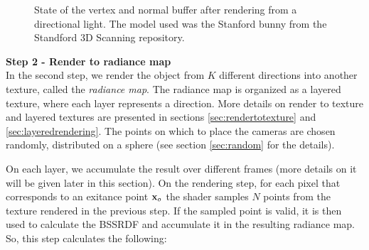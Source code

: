 \begin{figure}
\centering
{}
\label{fig:lightbuffers}
\caption{State of the vertex and normal buffer after rendering from a directional light. The model used was the Stanford bunny from the Standford 3D Scanning repository.}
\end{figure}

\textbf{Step 2 - Render to radiance map} \\
In the second step, we render the object from $K$ different directions into another texture, called the \emph{radiance map}. The radiance map is organized as a layered texture, where each layer represents a direction. More details on render to texture and layered textures are presented in sections \ref{sec:rendertotexture} and \ref{sec:layeredrendering}. The points on which to place the cameras are chosen randomly, distributed on a sphere (see section \ref{sec:random} for the details). 

On each layer, we accumulate the result over different frames (more details on it will be given later in this section). On the rendering step, for each pixel that corresponds to an exitance point $\mathbf{x}_o$ the shader samples $N$ points from the texture rendered in the previous step. If the sampled point is valid, it is then used to calculate the BSSRDF and accumulate it in the resulting radiance map. So, this step calculates the following:

